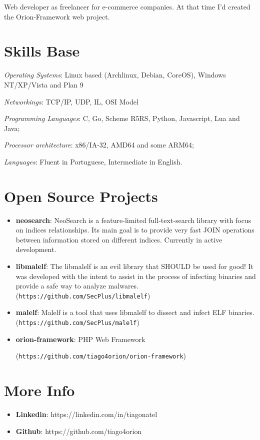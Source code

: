 \documentclass[margin]{res}
\begin{document}
\begin{resume}
   Web developer as freelancer for e-commerce companies. At that time I'd created the Orion-Framework web project.



\section{Skills Base}  \textit{Operating Systems}:  Linux based (Archlinux, Debian, CoreOS), Windows NT/XP/Vista and Plan 9

			\textit{Networkings}: TCP/IP, UDP, IL, OSI Model
  
			\textit{Programming Languages}: C, Go, Scheme R5RS, Python, Javascript, Lua and Java;
  
			\textit{Processor architecture}:  x86/IA-32, AMD64 and some ARM64;

			\textit{Languages}: Fluent in Portuguese, Intermediate in English.
 
\section{Open Source Projects}
		\begin{itemize}
		    \vspace{2mm}
		    \item \textbf{neosearch}: NeoSearch is a feature-limited full-text-search library with focus on indices relationships. Its main goal is to provide very fast JOIN operations between information stored on different indices. Currently in active development.  \vspace{1mm}
		    \item \textbf{libmalelf}: The libmalelf is an evil library that SHOULD be used for good! It was developed
		                              with the intent to assist in the process of infecting binaries and provide a safe 
		                              way to analyze malwares. (\texttt{https://github.com/SecPlus/libmalelf})\vspace{1mm}
		                              
		    \item \textbf{malelf}: Malelf is a tool that uses libmalelf to dissect and infect ELF binaries. 
		                           (\texttt{https://github.com/SecPlus/malelf})
		 \item \textbf{orion-framework}: PHP Web Framework 
		 
		 	(\texttt{https://github.com/tiago4orion/orion-framework})
		
		\end{itemize}
 
\section{More Info}
    \begin{itemize}
        \item \textbf{Linkedin}: https://linkedin.com/in/tiagonatel
         \item \textbf{Github}: https://github.com/tiago4orion
    \end{itemize}


\end{resume} 
\end{document}
